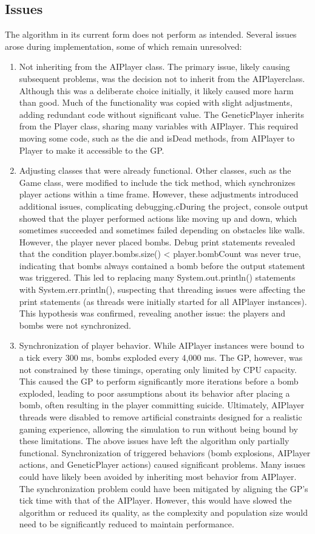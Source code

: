 \documentclass[sigconf]{acmart} %
\begin{document}
\subsection{Issues}
The algorithm in its current form does not perform as intended. Several issues arose during implementation, some of which remain unresolved: 
\begin{enumerate}
      \item Not inheriting from the AIPlayer class. 
      The primary issue, likely causing subsequent problems, was the decision not to inherit from the AIPlayerclass. Although this was a deliberate choice initially, it likely caused more harm than good. Much of the functionality was copied with slight adjustments, adding redundant code without significant value. The GeneticPlayer inherits from the Player class, sharing many variables with AIPlayer. This required moving some code, such as the die and isDead methods, from AIPlayer to Player to make it accessible to the GP.
      \item Adjusting classes that were already functional. 
      Other classes, such as the Game class, were modified to include the tick method, which synchronizes player actions within a time frame. However, these adjustments introduced additional issues, complicating debugging.cDuring the project, console output showed that the player performed actions like moving up and down, which sometimes succeeded and sometimes failed depending on obstacles like walls. However, the player never placed bombs. Debug print statements revealed that the condition player.bombs.size() < player.bombCount was never true, indicating that bombs always contained a bomb before the output statement was triggered. This led to replacing many System.out.println() statements with System.err.println(), suspecting that threading issues were affecting the print statements (as threads were initially started for all AIPlayer instances). This hypothesis was confirmed, revealing another issue: the players and bombs were not synchronized.
      \item Synchronization of player behavior. 
      While AIPlayer instances were bound to a tick every 300 ms, bombs exploded every 4,000 ms. The GP, however, was not constrained by these timings, operating only limited by CPU capacity. This caused the GP to perform significantly more iterations before a bomb exploded, leading to poor assumptions about its behavior after placing a bomb, often resulting in the player committing suicide. Ultimately, AIPlayer threads were disabled to remove artificial constraints designed for a realistic gaming experience, allowing the simulation to run without being bound by these limitations. The above issues have left the algorithm only partially functional. Synchronization of triggered behaviors (bomb explosions, AIPlayer actions, and GeneticPlayer actions) caused significant problems. Many issues could have likely been avoided by inheriting most behavior from AIPlayer. The synchronization problem could have been mitigated by aligning the GP's tick time with that of the AIPlayer. However, this would have slowed the algorithm or reduced its quality, as the complexity and population size would need to be significantly reduced to maintain performance. 
\end{enumerate}


\end{document}
